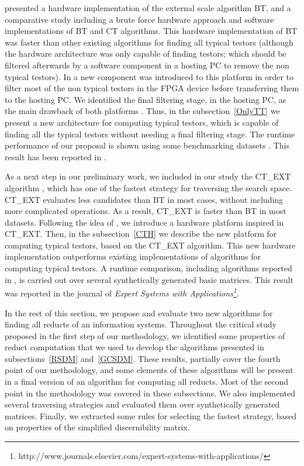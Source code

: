 \documentclass[authoryear,11pt]{elsarticle}
\begin{document}
	\cite{Rojas07} presented a hardware implementation of the external scale algorithm BT, and a 
	comparative study including a brute force hardware approach and software implementations of BT and 
	CT \citep{Bravo83} algorithms. 
	This hardware implementation of BT was faster than other existing algorithms for finding all
	typical	testors (although the hardware architecture was only capable of finding testors; which should 
	be filtered afterwards by a software component in a hosting PC to remove the non typical testors). 
	In \citep{Rojas12} a new component was introduced to this platform in order to filter most of the non 
	typical testors in the FPGA device before transferring them to the hosting PC. We identified the final
	filtering stage, in the hosting PC, as the main drawback of both platforms \citep{Rojas07,Rojas12}.
	Thus, in the subsection~\ref{OnlyTT} we present a new architecture 
	for computing typical testors, which is capable of finding all the typical testors without needing
	a final filtering stage. 
	The runtime performance of our proposal is shown using some benchmarking datasets \citep{Bache13}.
	This result has been reported in \citep{Rodriguez14}. 
	
	As a next step in our preliminary work, we included in our study the CT\_EXT algorithm \citep{Sanchez07},
	which has one of the fastest strategy for traversing the search space.
	CT\_EXT evaluates less candidates than BT in most cases, without including more complicated operations.
	As a result, CT\_EXT is faster than BT in most datasets. Following the idea of \cite{Rojas07}, we introduce
	a hardware platform inspired in CT\_EXT.
	Then, in the subsection~\ref{CTH} we describe the new platform for computing typical testors, based on the 
	CT\_EXT algorithm. This new hardware implementation outperforms existing implementations of algorithms 
	for computing typical testors. A runtime comparison, including algorithms reported in 
	\citep{Rodriguez14,Sanchez07}, is carried out over several synthetically generated basic matrices.
	This result was reported in the journal of \emph{Expert Systems with 
	Applications\footnote{http://www.journals.elsevier.com/expert-systems-with-applications/}}.
	
	In the rest of this section, we propose and evaluate two new algorithms for finding all reducts of 
	an information systems. Throughout the critical study proposed in the first step of our methodology,
	we identified some properties of reduct computation that we used to develop the algorithms presented in
	subsections~\ref{RSDM} and~\ref{GCSDM}. These results, partially cover the fourth point of our
	methodology, and some elements of these algorithms will be present in a final version of an algorithm
	for computing all reducts. Most of the second point in the methodology was covered in these subsections.
	We also implemented several traversing strategies and evaluated them over synthetically generated matrices.
	Finally, we extracted some rules for selecting the fastest strategy, based on properties of the simplified
	discernibility matrix.
	
\end{document}
